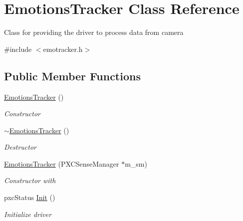 \hypertarget{class_emotions_tracker}{}\section{Emotions\+Tracker Class Reference}
\label{class_emotions_tracker}


Class for providing the driver to process data from camera  




{\ttfamily \#include $<$emotracker.\+h$>$}

\subsection*{Public Member Functions}
\begin{DoxyCompactItemize}
\item 
\mbox{\label{class_emotions_tracker_afb06d6882dd40a40b94ce3579769ae2c}} 
\hyperlink{class_emotions_tracker_afb06d6882dd40a40b94ce3579769ae2c}{Emotions\+Tracker} ()
\begin{DoxyCompactList}\small\item\em Constructor \end{DoxyCompactList}\item 
\mbox{\label{class_emotions_tracker_ab4cf40eb06b6b4728053bb6d143821df}} 
\hyperlink{class_emotions_tracker_ab4cf40eb06b6b4728053bb6d143821df}{$\sim$\+Emotions\+Tracker} ()
\begin{DoxyCompactList}\small\item\em Destructor \end{DoxyCompactList}\item 
\hyperlink{class_emotions_tracker_a3fe760d853d9f56830ad241cfea10aeb}{Emotions\+Tracker} (P\+X\+C\+Sense\+Manager $\ast$m\+\_\+sm)
\begin{DoxyCompactList}\small\item\em Constructor with \end{DoxyCompactList}\item 
\mbox{\label{class_emotions_tracker_a83fa504b5116e572602868df1cd77f6f}} 
pxc\+Status \hyperlink{class_emotions_tracker_a83fa504b5116e572602868df1cd77f6f}{Init} ()
\begin{DoxyCompactList}\small\item\em Initialize driver \end{DoxyCompactList}\item 

\end{DoxyCompactItemize}
